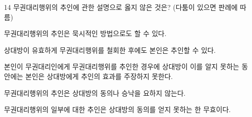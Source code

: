 \begin{question}{14}
무권대리행위의 추인에 관한 설명으로 옳지 않은 것은? (다툼이 있으면 판례에 따름)
\begin{choices}
  \item 무권대리행위의 추인은 묵시적인 방법으로도 할 수 있다.
  \item 상대방이 유효하게 무권대리행위를 철회한 후에도 본인은 추인할 수 있다.
  \item 본인이 무권대리인에게 무권대리행위를 추인한 경우에 상대방이 이를 알지 못하는 동안에는 본인은 상대방에게 추인의 효과를 주장하지 못한다.
  \item 무권대리행위의 추인은 상대방의 동의나 승낙을 요하지 않는다.
  \item 무권대리행위의 일부에 대한 추인은 상대방의 동의를 얻지 못하는 한 무효이다.
\end{choices}
\end{question}
